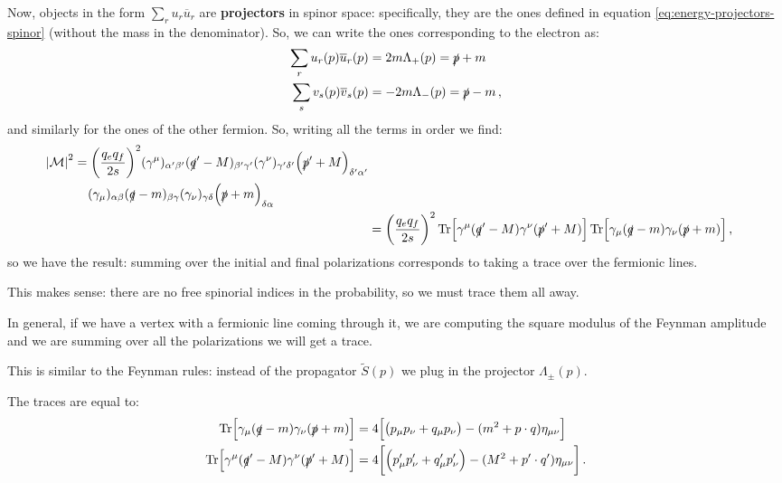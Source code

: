 \documentclass[main.tex]{subfiles}
\begin{document}
Now, objects in the form \(\sum _{r} u_r \overline{u}_{r}\) are \textbf{projectors} in spinor space: specifically, they are the ones defined in equation \eqref{eq:energy-projectors-spinor} (without the mass in the denominator). 
So, we can write the ones corresponding to the electron as: 
%
\begin{align}
\sum _{r} u_r (p) \overline{u}_r (p) &= 2 m \Lambda_{+} (p) = \slashed{p} + m \\
\sum _{s} v_s (p) \overline{v}_s (p) &= -2 m \Lambda_{-} (p) = \slashed{p} - m
\,,
\end{align}
%
and similarly for the ones of the other fermion.
So, writing all the terms in order we find: 
%
\begin{align}
\begin{split}
\abs{\mathcal{M}}^2 &= 
\qty( \frac{q_e q_f}{2 s})^2 
(\gamma^{\mu })_{ \alpha ' \beta '}
(\slashed{q}' - M)_{\beta ' \gamma '}
(\gamma^{\nu })_{ \gamma ' \delta '}
\qty(\slashed{p}' + M)_{ \delta ' \alpha '} \\
&\phantom{=}\ 
(\gamma_{\mu })_{ \alpha  \beta }
(\slashed{q} - m)_{\beta  \gamma }
(\gamma_{\nu })_{ \gamma  \delta }
\qty(\slashed{p} + m)_{ \delta  \alpha }
\end{split}  \\
&= 
\qty( \frac{q_e q_f}{2 s})^2 
\Tr [\gamma^{\mu } (\slashed{q}' - M) \gamma^{\nu } (\slashed{p}' + M)]
\Tr [\gamma_{\mu } (\slashed{q} - m) \gamma_{\nu } (\slashed{p} + m)]
\,,
\end{align}
%
so we have the result: summing over the initial and final polarizations corresponds to taking a trace over the fermionic lines. 

This makes sense: there are no free spinorial indices in the probability, so we must trace them all away. 


In general, if we have a vertex with a fermionic line coming through it, we are computing the square modulus of the Feynman amplitude and we are summing over all the polarizations we will get a trace. 

This is similar to the Feynman rules: instead of the propagator \(\widetilde{S}(p)\) we plug in the projector \(\Lambda_{\pm }(p)\). 

\begin{claim}
The traces are equal to: 
%
\begin{align} \label{eq:fermion-loop-trace-identity}
\Tr [\gamma_{\mu } (\slashed{q} - m) \gamma_{\nu } (\slashed{p} + m)] &= 
4 \qty[\qty(p_{\mu } p_{\nu } + q_{\mu } p_{\nu }) - (m^2 + p \cdot q) \eta_{\mu \nu}] \\
\Tr [\gamma^{\mu } (\slashed{q}' - M) \gamma^{\nu } (\slashed{p}' + M)] 
&= 4 \qty[\qty(p_{\mu }' p_{\nu }' + q_{\mu }' p_{\nu }') - (M^2 + p' \cdot q') \eta_{\mu \nu}] 
\,.
\end{align}
\end{claim}
\end{document}
